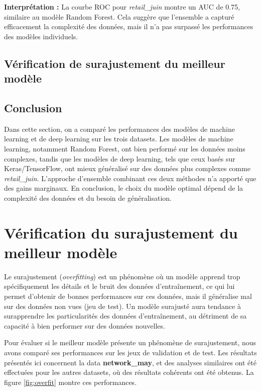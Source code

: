 \textbf{Interprétation :} La courbe ROC pour \textit{retail\_juin} montre un AUC de 0.75, similaire au modèle Random Forest. Cela suggère que l'ensemble a capturé efficacement la complexité des données, mais il n'a pas surpassé les performances des modèles individuels.

\subsection{Vérification de surajustement du meilleur modèle}
\subsection{Conclusion}

Dans cette section, on a comparé les performances des modèles de machine learning et de deep learning sur les trois datasets. Les modèles de machine learning, notamment Random Forest, ont bien performé sur les données moins complexes, tandis que les modèles de deep learning, tels que ceux basés sur Keras/TensorFlow, ont mieux généralisé sur des données plus complexes comme \textit{retail\_juin}. L'approche d'ensemble combinant ces deux méthodes n'a apporté que des gains marginaux. En conclusion, le choix du modèle optimal dépend de la complexité des données et du besoin de généralisation.
\section{Vérification du surajustement du meilleur modèle}

Le surajustement (\textit{overfitting}) est un phénomène où un modèle apprend trop spécifiquement les détails et le bruit des données d'entraînement, ce qui lui permet d'obtenir de bonnes performances sur ces données, mais il généralise mal sur des données non vues (jeu de test). Un modèle surajusté aura tendance à surapprendre les particularités des données d'entraînement, au détriment de sa capacité à bien performer sur des données nouvelles.

Pour évaluer si le meilleur modèle présente un phénomène de surajustement, nous avons comparé ses performances sur les jeux de validation et de test. Les résultats présentés ici concernent la data \textbf{network\_may}, et des analyses similaires ont été effectuées pour les autres datasets, où des résultats cohérents ont été obtenus. La figure \ref{fig:overfit} montre ces performances.

